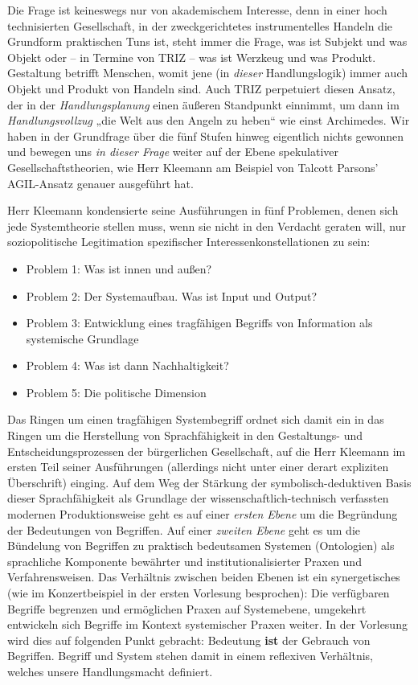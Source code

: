 \documentclass[11pt,a4paper]{article}
\begin{document}
Die Frage ist keineswegs nur von akademischem Interesse, denn in einer hoch
technisierten Gesellschaft, in der zweckgerichtetes instrumentelles Handeln
die Grundform praktischen Tuns ist, steht immer die Frage, was ist Subjekt und
was Objekt oder -- in Termine von TRIZ -- was ist Werzkeug und was
Produkt. Gestaltung betrifft Menschen, womit jene (in \emph{dieser}
Handlungslogik) immer auch Objekt und Produkt von Handeln sind. Auch TRIZ
perpetuiert diesen Ansatz, der in der \emph{Handlungsplanung} einen äußeren
Standpunkt einnimmt, um dann im \emph{Handlungsvollzug} „die Welt aus den
Angeln zu heben“ wie einst Archimedes. Wir haben in der Grundfrage über die
fünf Stufen hinweg eigentlich nichts gewonnen und bewegen uns \emph{in dieser
  Frage} weiter auf der Ebene spekulativer Gesellschaftstheorien, wie Herr
Kleemann am Beispiel von Talcott Parsons' AGIL-Ansatz genauer ausgeführt hat.

Herr Kleemann kondensierte seine Ausführungen in fünf Problemen, denen sich
jede Systemtheorie stellen muss, wenn sie nicht in den Verdacht geraten will,
nur soziopolitische Legitimation spezifischer Interessenkonstellationen zu
sein:

\begin{itemize}[noitemsep]
\item Problem 1: Was ist innen und außen?
\item Problem 2: Der Systemaufbau. Was ist Input und Output?
\item Problem 3: Entwicklung eines tragfähigen Begriffs von Information als
  systemische Grundlage
\item Problem 4: Was ist dann Nachhaltigkeit?
\item Problem 5: Die politische Dimension
\end{itemize}

Das Ringen um einen tragfähigen Systembegriff ordnet sich damit ein in das
Ringen um die Herstellung von Sprachfähigkeit in den Gestaltungs- und
Entscheidungsprozessen der bürgerlichen Gesellschaft, auf die Herr Kleemann im
ersten Teil seiner Ausführungen (allerdings nicht unter einer derart
expliziten Überschrift) einging. Auf dem Weg der Stärkung der
symbolisch-deduktiven Basis dieser Sprachfähigkeit als Grundlage der
wissenschaftlich-technisch verfassten modernen Produktionsweise geht es auf
einer \emph{ersten Ebene} um die Begründung der Bedeutungen von Begriffen. Auf
einer \emph{zweiten Ebene} geht es um die Bündelung von Begriffen zu praktisch
bedeutsamen Systemen (Ontologien) als sprachliche Komponente bewährter und
institutionalisierter Praxen und Verfahrensweisen. Das Verhältnis zwischen
beiden Ebenen ist ein synergetisches (wie im Konzertbeispiel in der ersten
Vorlesung besprochen): Die verfügbaren Begriffe begrenzen und ermöglichen
Praxen auf Systemebene, umgekehrt entwickeln sich Begriffe im Kontext
systemischer Praxen weiter. In der Vorlesung wird dies auf folgenden Punkt
gebracht: Bedeutung \textbf{ist} der Gebrauch von Begriffen.  Begriff und
System stehen damit in einem reflexiven Verhältnis, welches unsere
Handlungsmacht definiert.
\end{document}
